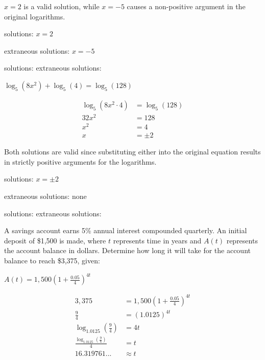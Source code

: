\documentclass[addpoints]{exam}
\begin{document}
\begin{questions}
\begin{solution}
 \(x = 2\) is a valid solution, while \(x = -5\) causes a non-positive argument in the original logarithms. 

solutions: \(\boxed{ x = 2 }\)

extraneous solutions: \(\boxed{ x = -5 }\)
\end{solution}
\par solutions: \fillin[][1.5in]  extraneous solutions: \fillin[][1.5in]\newpage

\question[6] \label{exact-end}
\(\displaystyle{ \log_{5}(8x^2) + \log_{5}(4) = \log_{5}(128) }\)
\begin{solution}
\[\begin{aligned} \log_{5}(8x^2 \cdot 4) &= \log_{5}(128) \\ 32x^2 &= 128 \\ x^2 &= 4 \\ x &= \pm 2 \end{aligned}\]

 Both solutions are valid since substituting either into the original equation results in strictly positive arguments for the logarithms. 

solutions: \(\boxed{ x = \pm 2 }\)

extraneous solutions: \(\boxed{ \text{none} }\)
\end{solution}
\par solutions: \fillin[][1.5in]  extraneous solutions: \fillin[][1.5in]

\question[6] A savings account earns 5\% annual interest compounded quarterly. An initial deposit of \$1,500 is made, where $t$ represents time in years and $A(t)$ represents the account balance in dollars. Determine how long it will take for the account balance to reach \$3,375, given:

\(\displaystyle{ \displaystyle{A(t) = 1,500 \left( 1 + \frac{0.05}{4} \right)^{4t}} }\)
\begin{solution}
\[\begin{aligned} 3,375 &= 1,500 \left( 1 + \frac{0.05}{4} \right)^{4t} \\ \frac{9}{4} &= (1.0125)^{4t} \\ \log_{1.0125}\left(\frac{9}{4}\right) &= 4t \\ \frac{\log_{1.0125}\left(\frac{9}{4}\right)}{4} &= t \\ 16.319761... &\approx t \end{aligned}\]


\end{solution}
\end{questions}
\end{document}
